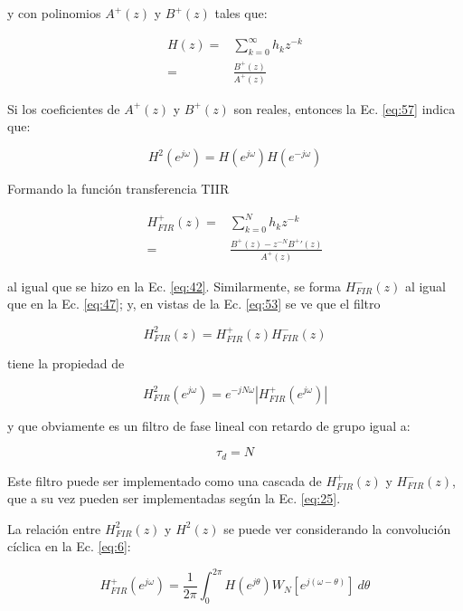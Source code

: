 \documentclass[conference]{IEEEtran}
\begin{document}
y con polinomios \(A^{ + }(z)\) y \(B^{ + }(z)\) tales que:

\begin{align}
    H(z) =& \sum_{k=0}^{\infty}{h_k z^{-k}}\\
         =& \frac{B^{ + }(z)}{A^{ + }(z)}
\end{align}

Si los coeficientes de \(A^{ + }(z)\) y \(B^{ + }(z)\) son reales, entonces la Ec. \ref{eq:57} indica que:

\begin{equation}
    H^2 \left( e^{j\omega} \right) = H \left( e^{j\omega} \right) H \left( e^{-j\omega} \right)
\end{equation}

Formando la función transferencia TIIR

\begin{align}
    H_{FIR}^{ + }(z) =& \sum_{k=0}^{N}{h_k z^{-k}}\\
                     =& \frac{B^{ + }(z) - z^{-N} B^{ + }'(z)}{A^{ + }(z)}
\label{eq:60}
\end{align}

al igual que se hizo en la Ec. \ref{eq:42}. Similarmente, se forma \(H_{FIR}^{-}(z)\) al igual que en la Ec. \ref{eq:47}; y, en vistas de la Ec. \ref{eq:53} se ve que el filtro

\begin{equation}
    H^2_{FIR}(z) = H_{FIR}^{ + }(z) H_{FIR}^{ - }(z)
\end{equation}

tiene la propiedad de

\begin{equation}
    H_{FIR}^{ 2 }\left( e^{j\omega} \right) = e^{-jN\omega} | H_{FIR}^{ +}\left( e^{j\omega} \right) |
\end{equation}

y que obviamente es un filtro de fase lineal con retardo de grupo igual a:

\begin{equation}
    \tau_d = N
\end{equation}

Este filtro puede ser implementado como una cascada de \(H_{FIR}^{ +}(z)\) y \(H_{FIR}^{ -}(z)\), que a su vez pueden ser implementadas según la Ec. \ref{eq:25}.

La relación entre \(H_{FIR}^{2}(z)\) y \(H^2(z)\) se puede ver considerando la convolución cíclica en la Ec. \ref{eq:6}:

\begin{equation}
    H_{FIR}^{ + } \left( e^{j\omega} \right) = \frac{1}{2\pi} \int_0^{2\pi}{H \left( e^{j\theta} \right) W_N \left[ e^{j(\omega-\theta)} \right] \: d\theta}
\end{equation}
\end{document}
